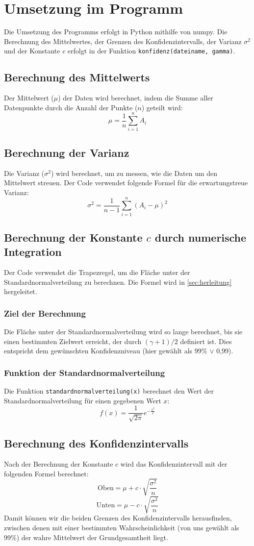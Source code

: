 \section{Umsetzung im Programm}
\label{sec:umsetzung_im_programm}
Die Umsetzung des Programms erfolgt in Python mithilfe von numpy. Die Berechnung des Mittelwertes, der Grenzen des Konfidenzintervalls, der Varianz $\sigma^2$ und der Konstante $c$ erfolgt in der Funktion \texttt{konfidenz(dateiname, gamma)}.
\subsection{Berechnung des Mittelwerts}
Der Mittelwert (\(\mu\)) der Daten wird berechnet, indem die Summe aller Datenpunkte durch die Anzahl der Punkte (\(n\)) geteilt wird:
\[
\mu = \frac{1}{n} \sum_{i=1}^{n} A_i
\]

\subsection{Berechnung der Varianz}
Die Varianz (\(\sigma^2\)) wird berechnet, um zu messen, wie die Daten um den Mittelwert streuen. Der Code verwendet folgende Formel für die erwartungstreue Varianz:
\[
\sigma^2 = \frac{1}{n-1} \sum_{i=1}^{n} (A_i - \mu)^2
\]

\subsection{Berechnung der Konstante \(c\) durch numerische Integration}
Der Code verwendet die Trapezregel, um die Fläche unter der Standardnormalverteilung zu berechnen. Die Formel wird in \autoref{sec:herleitung} hergeleitet.

\subsubsection{Ziel der Berechnung}
Die Fläche unter der Standardnormalverteilung wird so lange berechnet, bis sie einen bestimmten Zielwert erreicht, der durch \((\gamma + 1) / 2\) definiert ist. Dies entspricht dem gewünschten Konfidenzniveau (hier gewählt als 99\% $\vee$ 0,99).

\subsubsection{Funktion der Standardnormalverteilung}
Die Funktion \texttt{standardnormalverteilung(x)} berechnet den Wert der Standardnormalverteilung für einen gegebenen Wert \(x\):
\[
f(x) = \frac{1}{\sqrt{2\pi}} e^{-\frac{x^2}{2}}
\]

\subsection{Berechnung des Konfidenzintervalls}
Nach der Berechnung der Konstante \(c\) wird das Konfidenzintervall mit der folgenden Formel berechnet:
\[
\text{Oben} = \mu + c \cdot \sqrt{\frac{\sigma^2}{n}}
\]
\[
\text{Unten} = \mu - c \cdot \sqrt{\frac{\sigma^2}{n}}
\]
Damit können wir die beiden Grenzen des Konfidenzintervalls herausfinden, zwischen denen mit einer bestimmten Wahrscheinlichkeit (von uns gewählt als 99\%) der wahre Mittelwert der Grundgesamtheit liegt.

